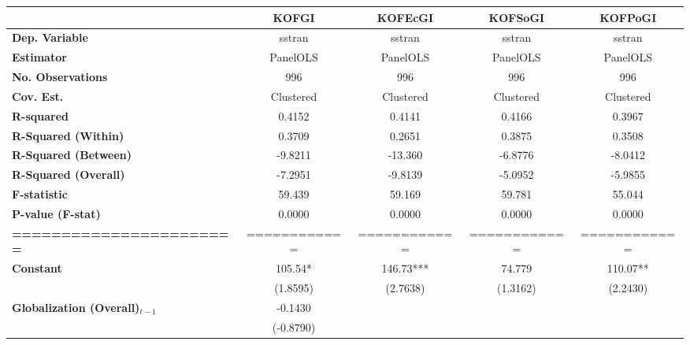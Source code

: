 \begin{center}
\begin{tabular}{lcccc}
\toprule
                                   & \textbf{KOFGI} & \textbf{KOFEcGI} & \textbf{KOFSoGI} & \textbf{KOFPoGI}  \\
\midrule
\textbf{Dep. Variable}             &     sstran     &      sstran      &      sstran      &      sstran       \\
\textbf{Estimator}                 &    PanelOLS    &     PanelOLS     &     PanelOLS     &     PanelOLS      \\
\textbf{No. Observations}          &      996       &       996        &       996        &       996         \\
\textbf{Cov. Est.}                 &   Clustered    &    Clustered     &    Clustered     &    Clustered      \\
\textbf{R-squared}                 &     0.4152     &      0.4141      &      0.4166      &      0.3967       \\
\textbf{R-Squared (Within)}        &     0.3709     &      0.2651      &      0.3875      &      0.3508       \\
\textbf{R-Squared (Between)}       &    -9.8211     &     -13.360      &     -6.8776      &     -8.0412       \\
\textbf{R-Squared (Overall)}       &    -7.2951     &     -9.8139      &     -5.0952      &     -5.9855       \\
\textbf{F-statistic}               &     59.439     &      59.169      &      59.781      &      55.044       \\
\textbf{P-value (F-stat)}          &     0.0000     &      0.0000      &      0.0000      &      0.0000       \\
\textbf{=======================}   &  ============  &   ============   &   ============   &   ============    \\
\textbf{Constant}                     &    105.54*     &    146.73***     &      74.779      &     110.07**      \\
\textbf{ }                         &    (1.8595)    &     (2.7638)     &     (1.3162)     &     (2.2430)      \\
\textbf{Globalization (Overall)$_{t-1}$}               &    -0.1430     &                  &                  &                   \\
\textbf{ }                         &   (-0.8790)    &                  &                  &                   \\

\end{tabular}
\end{center}
